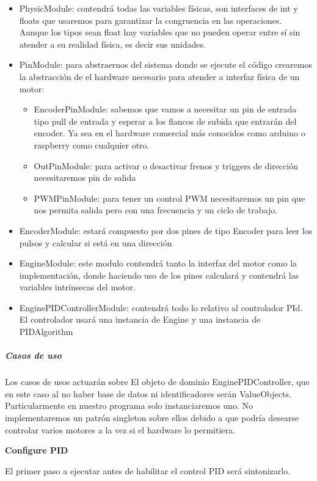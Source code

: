 \begin{itemize}
    \item PhysicModule: contendrá todas las variables físicas, son interfaces de int y floats que usaremos para garantizar la congruencia en las operaciones.
    Aunque los tipos sean float hay variables que no pueden operar entre sí sin atender a su realidad física, es decir sus unidades.
    \item PinModule: para abstraernos del sistema donde se ejecute el código crearemos la abstracción de el hardware necesario para atender a interfaz física de un motor:
    \begin{itemize}
        \item EncoderPinModule: sabemos que vamos a necesitar un pin de entrada tipo pull de entrada y esperar a los flancos de subida que entrarán del encoder.
        Ya sea en el hardware comercial más conocidos como arduino o raspberry como cualquier otro.
        \item OutPinModule: para activar o desactivar frenos y triggers de dirección necesitaremos pin de salida
        \item PWMPinModule: para tener un control PWM necesitaremos un pin que nos permita salida pero con una frecuencia y un ciclo de trabajo.
    \end{itemize}
    \item EncoderModule: estará compuesto por dos pines de tipo Encoder para leer los pulsos y calcular si está en una dirección
    \item EngineModule: este modulo contendrá tanto la interfaz del motor como la implementación, donde haciendo uso de los pines calculará y contendrá las variables intrínsecas del motor.
    \item EnginePIDControllerModule: contendrá todo lo relativo al controlador PId. El controlador usará una instancia de Engine y una instancia de PIDAlgorithm
\end{itemize}

\subparagraph{Casos de uso}

Los casos de usos actuarán sobre El objeto de dominio EnginePIDController, que en este caso al no haber base de datos ni identificadores serán ValueObjects. Particularmente en nuestro programa solo instanciaremos uno. No implementaremos un patrón singleton sobre ellos debido a que podría desearse controlar varios motores a la vez si el hardware lo permitiera.

\textbf{Configure PID}

El primer paso a ejecutar antes de habilitar el control PID será sintonizarlo.


